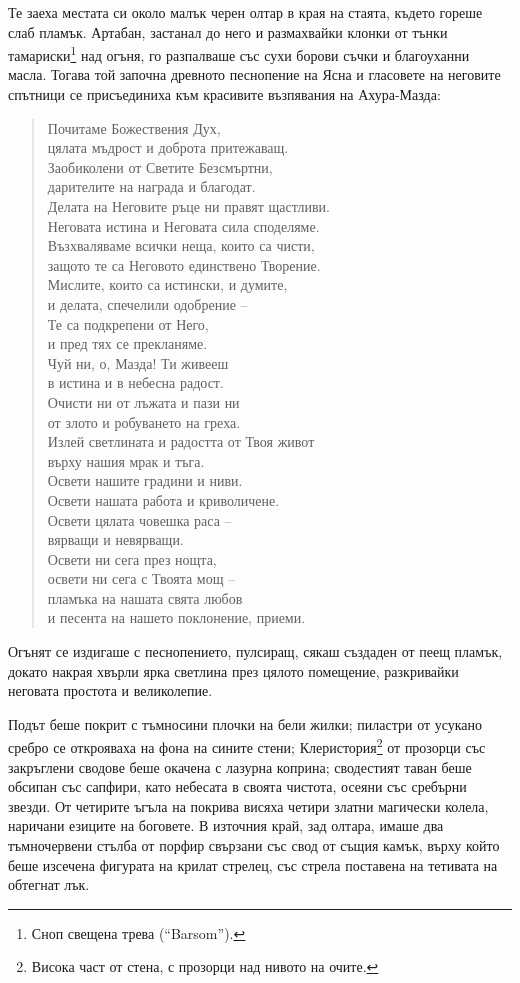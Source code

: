 Те заеха местата си около малък черен олтар в края на стаята, където гореше слаб
пламък. Артабан, застанал до него и размахвайки клонки от тънки
тамариски\footnote{Сноп свещена трева (``Barsom'').} над огъня, го разпалваше
със сухи борови съчки и благоуханни масла. Тогава той започна древното
песнопение на Ясна и гласовете на неговите спътници се присъединиха към
красивите възпявания на Ахура-Мазда:
\begin{quote}
  \begin{obeylines}
    \fontsize{9}{10}\selectfont
    \setlength{\leftskip}{1cm}
    Почитаме Божествения Дух,
    цялата мъдрост и доброта притежаващ.
    Заобиколени от Светите Безсмъртни,
    дарителите на награда и благодат.
    Делата на Неговите ръце ни правят щастливи.
    Неговата истина и Неговата сила споделяме.
    Възхваляваме всички неща, които са чисти,
    защото те са Неговото единствено Творение.
    Мислите, които са истински, и думите,
    и делата, спечелили одобрение --
    Те са подкрепени от Него,
    и пред тях се прекланяме.
    Чуй ни, о, Мазда! Ти живееш
    в истина и в небесна радост.
    Очисти ни от лъжата и пази ни
    от злото и робуването на греха.
    Излей светлината и радостта от Твоя живот
    върху нашия мрак и тъга.
    Освети нашите градини и ниви.
    Освети нашата работа и криволичене.
    Освети цялата човешка раса --
    вярващи и невярващи.
    Освети ни сега през нощта,
    освети ни сега с Твоята мощ --
    пламъка на нашата свята любов
    и песента на нашето поклонение, приеми.
  \end{obeylines}
\end{quote}

Огънят се издигаше с песнопението, пулсиращ, сякаш създаден от пеещ пламък,
докато накрая хвърли ярка светлина през цялото помещение, разкривайки неговата
простота и великолепие.

Подът беше покрит с тъмносини плочки на бели жилки; пиластри от усукано сребро
се открояваха на фона на сините стени; Клеристория\footnote{Висока част от
стена, с прозорци над нивото на очите.} от прозорци със закръглени сводове беше
окачена с лазурна коприна; сводестият таван беше обсипан със сапфири, като
небесата в своята чистота, осеяни със сребърни звезди. От четирите ъгъла на
покрива висяха четири златни магически колела, наричани езиците на боговете. В
източния край, зад олтара, имаше два тъмночервени стълба от порфир свързани със
свод от същия камък, върху който беше изсечена фигурата на крилат стрелец, със
стрела поставена на тетивата на обтегнат лък.


